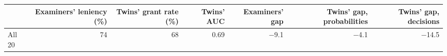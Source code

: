 \begin{tabular}{lrrrrrr}
\toprule
 & Examiners' leniency (\%) & Twins' grant rate (\%) & Twins' AUC & Examiners' gap & Twins' gap, probabilities & Twins' gap, decisions \\
\midrule
All 20 & 74 & 68 & 0.69 & $-$9.1 & $-$4.1 & $-$14.5 \\
\bottomrule
\end{tabular}
